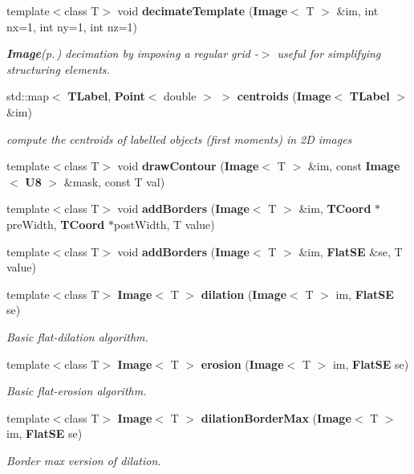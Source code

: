 \begin{CompactItemize}
template$<$class T$>$ void {\bf decimate\-Template} ({\bf Image}$<$ T $>$ \&im, int nx=1, int ny=1, int nz=1)
\begin{CompactList}\small\item\em {\bf Image}{\rm (p.\,\pageref{classLibTIM_1_1Image})} decimation by imposing a regular grid -$>$ useful for simplifying structuring elements. \item\end{CompactList}\item 
std::map$<$ {\bf TLabel}, {\bf Point}$<$ double $>$ $>$ {\bf centroids} ({\bf Image}$<$ {\bf TLabel} $>$ \&im)
\begin{CompactList}\small\item\em compute the centroids of labelled objects (first moments) in 2D images \item\end{CompactList}\item 
template$<$class T$>$ void {\bf draw\-Contour} ({\bf Image}$<$ T $>$ \&im, const {\bf Image}$<$ {\bf U8} $>$ \&mask, const T val)
\item 
template$<$class T$>$ void {\bf add\-Borders} ({\bf Image}$<$ T $>$ \&im, {\bf TCoord} $\ast$pre\-Width, {\bf TCoord} $\ast$post\-Width, T value)
\item 
template$<$class T$>$ void {\bf add\-Borders} ({\bf Image}$<$ T $>$ \&im, {\bf Flat\-SE} \&se, T value)
\item 
template$<$class T$>$ {\bf Image}$<$ T $>$ {\bf dilation} ({\bf Image}$<$ T $>$ im, {\bf Flat\-SE} se)
\begin{CompactList}\small\item\em Basic flat-dilation algorithm. \item\end{CompactList}\item 
template$<$class T$>$ {\bf Image}$<$ T $>$ {\bf erosion} ({\bf Image}$<$ T $>$ im, {\bf Flat\-SE} se)
\begin{CompactList}\small\item\em Basic flat-erosion algorithm. \item\end{CompactList}\item 
template$<$class T$>$ {\bf Image}$<$ T $>$ {\bf dilation\-Border\-Max} ({\bf Image}$<$ T $>$ im, {\bf Flat\-SE} se)
\begin{CompactList}\small\item\em Border max version of dilation. \item\end{CompactList}\item 

\end{CompactItemize}
